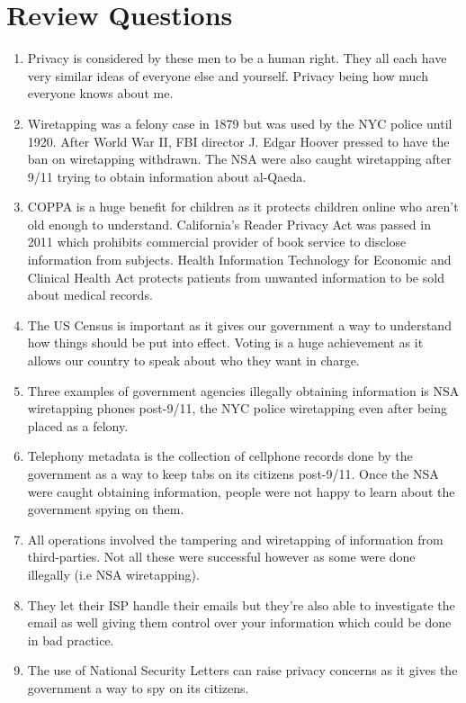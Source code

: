 \documentclass[12pt]{article}
\begin{document}
\section{Review Questions}
    \begin{enumerate}
        \item Privacy is considered by these men to be a human right. They all each have very similar ideas of everyone else and yourself. Privacy being how much everyone knows about me.
        \item Wiretapping was a felony case in 1879 but was used by the NYC police until 1920. After World War II, FBI director J. Edgar Hoover pressed to have the ban on wiretapping withdrawn. The NSA were also caught wiretapping after 9/11 trying to obtain information about al-Qaeda.
        \item COPPA is a huge benefit for children as it protects children online who aren't old enough to understand. California's Reader Privacy Act was passed in 2011 which prohibits commercial provider of book service to disclose information from subjects. Health Information Technology for Economic and Clinical Health Act protects patients from unwanted information to be sold about medical records.
        \item The US Census is important as it gives our government a way to understand how things should be put into effect. Voting is a huge achievement as it allows our country to speak about who they want in charge. 
        \item Three examples of government agencies illegally obtaining information is NSA wiretapping phones post-9/11, the NYC police wiretapping even after being placed as a felony. 
        \item Telephony metadata is the collection of cellphone records done by the government as a way to keep tabs on its citizens post-9/11. Once the NSA were caught obtaining information, people were not happy to learn about the government spying on them.
        \item All operations involved the tampering and wiretapping of information from third-parties. Not all these were successful however as some were done illegally (i.e NSA wiretapping).
        \item They let their ISP handle their emails but they're also able to investigate the email as well giving them control over your information which could be done in bad practice.
        \item The use of National Security Letters can raise privacy concerns as it gives the government a way to spy on its citizens.

\end{enumerate}
\end{document}
